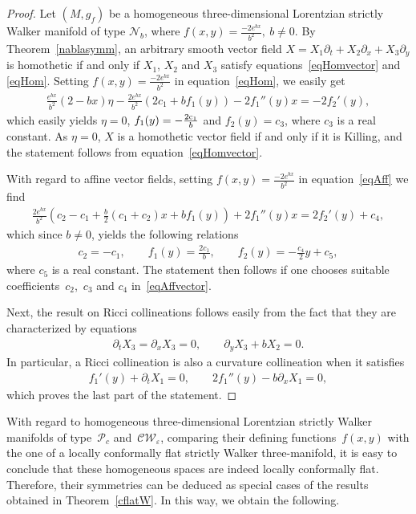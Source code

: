 \documentclass[10pt,a4paper]{amsart}
\numberwithin{equation}{section}
\begin{document}
\begin{proof}
Let $(M,g_f)$ be a homogeneous three-dimensional Lorentzian strictly Walker manifold of type $\mathcal N_b$, where $f(x,y)=\frac{-2e^{bx}}{b^2},\ b\neq 0$. By Theorem~\ref{nablasymm}, an arbitrary smooth vector f\/ield $X=X_1\partial_t+X_2\partial_x+X_3\partial_y$ is homothetic if and only if
$X_1$, $X_2$ and $X_3$ satisfy equations~\eqref{eqHomvector} and \eqref{eqHom}. Setting $f(x,y)=\frac{-2e^{bx}}{b^2}$ in equation~\eqref{eqHom}, we easily get
\begin{gather*}
\frac{e^{bx}}{b^2}(2-bx)\eta-\frac{2e^{bx}}{b^2}(2c_1+bf_1(y))-2f_1 ''(y)x=-2f_2 '(y),
\end{gather*}
which easily yields $\eta=0$, $ f_1(y)=-\frac{2{\rm c}_1}{b}$ and $f_2(y)=c_3$, where $c_3$ is a real constant. As $\eta=0$, $X$ is a homothetic vector f\/ield if and only if it is Killing, and the statement follows from equation~\eqref{eqHomvector}.

With regard to af\/f\/ine vector f\/ields, setting $f(x,y)=\frac{-2e^{bx}}{b^2}$ in equation~\eqref{eqAff} we f\/ind
\begin{gather*}
\frac{2e^{bx}}{b^2}\left(c_2-c_1+\frac{b}{2}(c_1+c_2)x+bf_1(y)\right)+2f_1 ''(y) x=2f_2 '(y)+c_4,
\end{gather*}
which since $b\neq 0$, {yields} the following relations
\begin{gather*}
c_2=-c_1,\qquad f_1(y)=\frac{2c_1}{b},\qquad f_2(y)=-\frac{c_4}{2}y+c_5,
\end{gather*}
where $c_5$ is a real constant. The statement then follows {if one chooses} suitable coef\/f\/i\-cients~$c_2$,~$c_3$ and $c_4$ in~\eqref{eqAffvector}.

Next, the result on Ricci collineations follows easily from the fact that they are characterized by equations
\begin{gather*}
\partial_tX_3=\partial_xX_3=0,\qquad \partial_yX_3+bX_2=0.
\end{gather*}
In particular, a Ricci collineation is also a curvature collineation when it satisf\/ies
\begin{gather*}
f_1 '(y)+\partial_tX_1=0,\qquad 2f_1 ''(y)-b\partial_xX_1=0,
\end{gather*}
which proves the last part of the statement.
\end{proof}

With regard to homogeneous three-dimensional Lorentzian strictly Walker manifolds of ty\-pe~$\mathcal P_c$ and~$\mathcal{CW}_\varepsilon$, comparing their def\/ining functions~$f(x,y)$ with the one of a locally conformally f\/lat strictly Walker three-manifold, it is easy to conclude that these homogeneous spaces are indeed locally conformally f\/lat. Therefore, their symmetries can be deduced as special cases of the results obtained in Theorem~\ref{cflatW}. In this way, we obtain the following.
\end{document}
